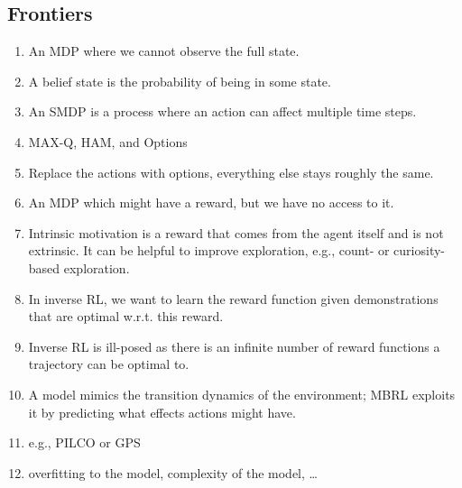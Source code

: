 		\subsection{Frontiers}
			\begin{enumerate}
				\item An \ac{MDP} where we cannot observe the full state.
				\item A belief state is the probability of being in some state.  %
				\item An \ac{SMDP} is a process where an action can affect multiple time steps.
				\item MAX-Q, \ac{HAM}, and Options  %
				\item Replace the actions with options, everything else stays roughly the same.
				\item An \ac{MDP} which might have a reward, but we have no access to it.
				\item Intrinsic motivation is a reward that comes from the agent itself and is not extrinsic. It can be helpful to improve exploration, e.g., count- or curiosity-based exploration.
				\item In inverse \ac{RL}, we want to learn the reward function given demonstrations that are optimal w.r.t. this reward.
				\item Inverse \ac{RL} is ill-posed as there is an infinite number of reward functions a trajectory can be optimal to.
				\item A model mimics the transition dynamics of the environment; \ac{MBRL} exploits it by predicting what effects actions might have.
				\item e.g., \ac{PILCO} or \ac{GPS}
				\item overfitting to the model, complexity of the model, \dots  %
			\end{enumerate}
